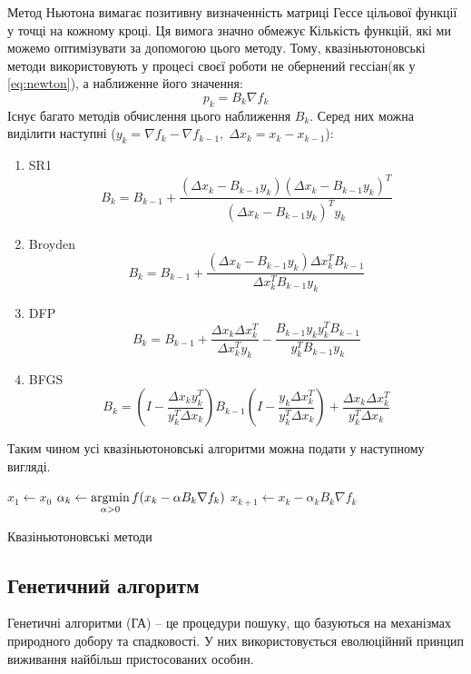 Метод Ньютона вимагає позитивну визначенність матриці Гессе
цільової функції у точці на кожному кроці. Ця вимога значно обмежує
Кількість функцій, які ми можемо оптимізувати за допомогою
цього методу. Тому, квазіньютоновські методи використовують
у процесі своєї роботи не обернений гессіан(як у \ref{eq:newton}),
а наближенне його значення:
\begin{equation}
    p_k = B_k \nabla f_k
\end{equation}
Існує багато методів обчислення цього наближення $B_k$.
Серед них можна виділити наступні
($y_k = \nabla f_k - \nabla f_{k-1}, \;
\Delta x_k = x_k - x_{k-1} $):
\begin{enumerate}
    \item SR1
    $$ B_k = B_{k-1} + \frac{(\Delta x_{k} - B_{k-1}y_k)
    (\Delta x_{k} - B_{k-1}y_k)^{T}}
    {(\Delta x_{k} - B_{k-1}y_k)^{T}y_k} $$
    \item Broyden
    $$ B_k = B_{k-1} + \frac{(\Delta x_{k} - B_{k-1}y_k)
    \Delta x_{k}^{T}B_{k-1}}
    {\Delta x_{k}^{T}B_{k-1}y_k} $$
    \item DFP
    $$ B_k = B_{k-1} + \frac{\Delta x_{k}\Delta x_{k}^{T}}
    {\Delta x_{k}^{T}y_k} - \frac{B_{k-1}y_ky_k^{T}B_{k-1}}{y_k^{T}B_{k-1}y_k} $$
    \item BFGS
    $$ B_k = \left( I - \frac{\Delta x_{k}y_k^{T}}{y_k^{T}\Delta x_k} \right) B_{k-1}
    \left( I - \frac{y_k \Delta x_{k}^{T}}{y_k^{T}\Delta x_k} \right) +
    \frac{\Delta x_{k}\Delta x_{k}^{T}}{y_k^{T}\Delta x_k}
     $$
\end{enumerate}

Таким чином усі квазіньютоновські алгоритми можна подати у наступному
вигляді.

\begin{algorithm}[H] \label{alg:newton}
    \SetAlgoLined
    $x_1 \leftarrow x_0$\;
    {
        $\alpha_k \leftarrow \mathop{\mathrm{argmin}}\limits_{\alpha > 0} f(x_{k} - \alpha B_k \nabla f_{k})$\;
        $x_{k+1} \leftarrow x_{k} - \alpha_k B_k \nabla f_{k}$\;
    }
    \caption{Квазіньютоновські методи}
\end{algorithm}

\subsection*{Генетичний алгоритм}

Генетичні алгоритми (ГА) -- це процедури пошуку, що базуються на механізмах природного добору та спадковості.
У них використовується еволюційний принцип виживання найбільш пристосованих особин.

